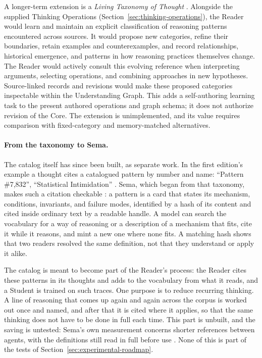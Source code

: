 \documentclass[11pt]{article}
\begin{document}
A longer-term extension is a \emph{Living Taxonomy of Thought}
\cite{westerberg2025superintelligence}. Alongside the
supplied Thinking Operations (Section~\ref{sec:thinking-operations}), the
Reader would learn and maintain an explicit
classification of reasoning patterns encountered across sources. It would
propose new categories, refine their boundaries, retain examples and
counterexamples, and record relationships, historical emergence, and patterns
in how reasoning practices themselves change. The Reader would actively
consult this evolving reference when interpreting arguments, selecting
operations, and combining approaches in new hypotheses. Source-linked records
and revisions would make these proposed categories inspectable within the
Understanding Graph. This adds a self-authoring learning task to the present
authored operations and graph schema; it does not authorize revision of the
Core. The extension is unimplemented, and its value requires comparison with
fixed-category and memory-matched alternatives.

\paragraph{From the taxonomy to Sema.}\label{sec:taxonomy-to-sema}
The catalog itself has since been built, as separate work. In the first
edition's example a thought cites a catalogued pattern by number and name:
``Pattern \#7,832'', ``Statistical Intimidation''
\cite{westerberg2025superintelligence}. Sema, which began from that taxonomy,
makes such a citation checkable \cite{westerberg2026sema}: a pattern is a card
that states its mechanism, conditions, invariants, and failure modes,
identified by a hash of its content and cited inside ordinary text by a
readable handle. A model can search the vocabulary for a way of reasoning or a
description of a mechanism that fits, cite it while it reasons, and mint a new
one where none fits. A matching hash shows that two readers resolved the same
definition, not that they understand or apply it alike.

The catalog is meant to become part of the Reader's process: the Reader cites
these patterns in its thoughts and adds to the vocabulary from what it reads,
and a Student is trained on such traces. One purpose is to reduce recurring
thinking. A line of reasoning that comes up again and again across the corpus
is worked out once and named, and after that it is cited where it applies, so
that the same thinking does not have to be done in full each time. This part
is unbuilt, and the saving is untested: Sema's own measurement concerns shorter
references between agents, with the definitions still read in full before use
\cite{westerberg2026sema}. None of this is part of the tests of
Section~\ref{sec:experimental-roadmap}.
\end{document}
